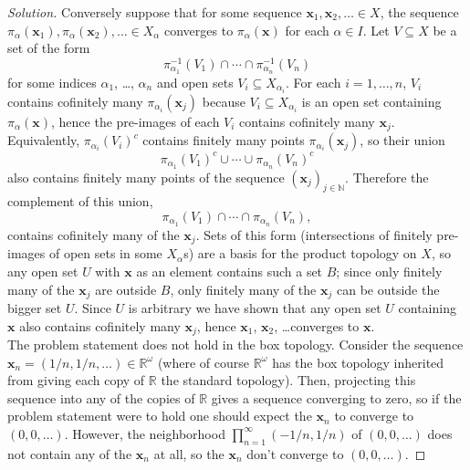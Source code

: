 \documentclass[10pt]{article}
\providecommand{\NN}{\mathbb N}
\providecommand{\RR}{\mathbb R}
\providecommand{\inv}{^{-1}}
\providecommand{\mb}[1]{\mathbf{#1}}
\newenvironment{soln}{\begin{proof}[Solution]}{\end{proof}}
\begin{document}
\begin{soln}
    Conversely suppose that for some sequence $\mb x_1,\mb x_2,\dots\in X$,
    the sequence $\pi_\alpha(\mb x_1), \pi_\alpha(\mb x_2), \dots\in X_\alpha$
    converges to $\pi_\alpha(\mb x)$ for each $\alpha\in I$.
    Let $V\subseteq X$ be a set of the form
    \begin{equation*}
	\pi_{\alpha_1}\inv(V_1)\cap\cdots\cap\pi_{\alpha_n}\inv(V_n)
    \end{equation*}
    for some indices $\alpha_1$, \dots, $\alpha_n$
    and open sets $V_i\subseteq X_{\alpha_i}$.
    For each $i=1,\dots,n$, $V_i$ contains cofinitely many $\pi_{\alpha_i}(\mb x_j)$
    because $V_i\subseteq X_{\alpha_i}$ is an open set containing $\pi_\alpha(\mb x)$,
    hence the pre-images of each $V_i$ contains cofinitely many $\mb x_j$.
    Equivalently, $\pi_{\alpha_i}(V_i)^c$ contains finitely many
    points $\pi_{\alpha_i}(\mb x_j)$, so their union
    \begin{equation*}
	\pi_{\alpha_1}(V_1)^c\cup\cdots\cup\pi_{\alpha_n}(V_n)^c
    \end{equation*}
    also contains finitely many points of the sequence $(\mb x_j)_{j\in\NN}$.
    Therefore the complement of this union,
    \begin{equation*}
	\pi_{\alpha_1}(V_1)\cap\cdots\cap\pi_{\alpha_n}(V_n),
    \end{equation*}
    contains cofinitely many of the $\mb x_j$.
    Sets of this form (intersections of finitely pre-images of open sets
    in some $X_\alpha$s) are a basis for the product topology on $X$,
    so any open set $U$ with $\mb x$ as an element contains such a set $B$;
    since only finitely many of the $\mb x_j$ are outside $B$,
    only finitely many of the $\mb x_j$ can be outside the bigger set $U$.
    Since $U$ is arbitrary we have shown that any open set $U$ containing $\mb x$
    also contains cofinitely many $\mb x_j$,
    hence $\mb x_1$, $\mb x_2$, \dots converges to $\mb x$.
    \\

    The problem statement does not hold in the box topology.
    Consider the sequence $\mb x_n = (1/n, 1/n, \dots)\in\RR^\omega$
    (where of course $\RR^\omega$ has the box topology
    inherited from giving each copy of $\RR$ the standard topology).
    Then, projecting this sequence into any of the copies of $\RR$
    gives a sequence converging to zero, so if the problem statement were to hold
    one should expect the $\mb x_n$ to converge to $(0,0,\dots)$.
    However, the neighborhood $\prod_{n=1}^\infty (-1/n,1/n)$ of
    $(0,0,\dots)$ does not contain any of the $\mb x_n$ at all,
    so the $\mb x_n$ don't converge to $(0,0,\dots)$.
\end{soln}
\pagebreak
\end{document}
